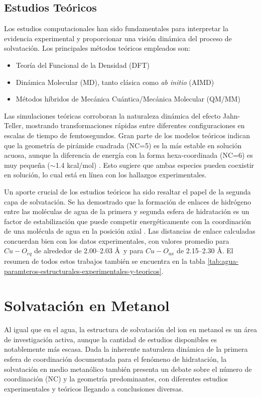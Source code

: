 \subsection*{Estudios Teóricos}

Los estudios computacionales han sido fundamentales para interpretar la evidencia experimental y proporcionar una visión dinámica del proceso de solvatación. Los principales métodos teóricos empleados son:
\begin{itemize}
    \item Teoría del Funcional de la Densidad (DFT)
    \item Dinámica Molecular (MD), tanto clásica como \textit{ab initio} (AIMD)
    \item Métodos híbridos de Mecánica Cuántica/Mecánica Molecular (QM/MM)
\end{itemize}

Las simulaciones teóricas corroboran la naturaleza dinámica del efecto Jahn-Teller, mostrando transformaciones rápidas entre diferentes configuraciones en escalas de tiempo de femtosegundos. Gran parte de los modelos teóricos indican que la geometría de pirámide cuadrada (NC=5) es la más estable en solución acuosa, aunque la diferencia de energía con la forma hexa-coordinada (NC=6) es muy pequeña ($\sim$1.4 kcal/mol) \cite{Wa-2008-01, Wa-2009-02}. Esto sugiere que ambas especies pueden coexistir en solución, lo cual está en línea con los hallazgos experimentales.

Un aporte crucial de los estudios teóricos ha sido resaltar el papel de la segunda capa de solvatación. Se ha demostrado que la formación de enlaces de hidrógeno entre las moléculas de agua de la primera y segunda esfera de hidratación es un factor de estabilización que puede competir energéticamente con la coordinación de una molécula de agua en la posición axial \cite{Wa-2007-03, Wa-2008-01,Wa-2024-01}. Las distancias de enlace calculadas concuerdan bien con los datos experimentales, con valores promedio para $Cu-O_{eq}$ de alrededor de 2.00--2.03 \AA \ y para $Cu-O_{ax}$ de 2.15--2.30 \AA. El resumen de todos estos trabajos también se encuentra en la tabla \ref{tab:agua-paramteros-estructurales-experimentales-y-teoricos}.

\section{Solvatación  en Metanol}


Al igual que en el agua, la estructura de solvatación del ion  en metanol es un área de investigación activa, aunque la cantidad de estudios disponibles es notablemente más escasa. Dada la inherente naturaleza dinámica de la primera esfera de coordinación documentada para el fenómeno de hidratación, la solvatación en medio metanólico también presenta un debate sobre el número de coordinación (NC) y la geometría predominantes, con diferentes estudios experimentales y teóricos llegando a conclusiones diversas.

